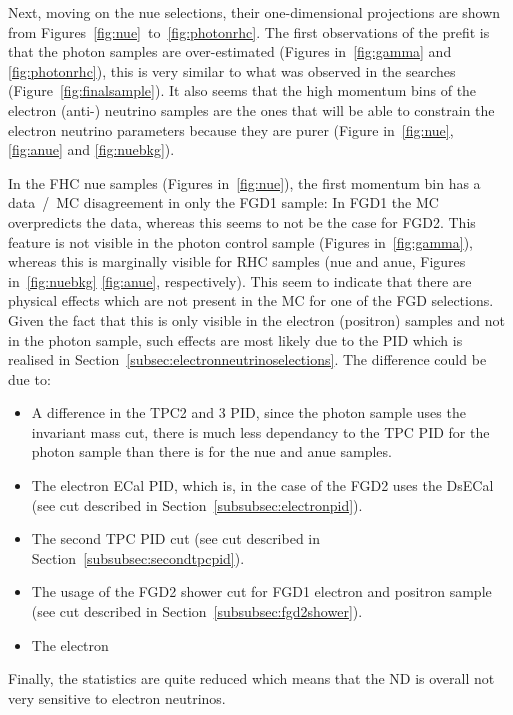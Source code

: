 Next, moving on the \Gls{nue} selections, their one-dimensional
projections are shown from
Figures~\ref{fig:nue}~to~\ref{fig:photonrhc}.  The first observations
of the prefit is that the photon samples are over-estimated (Figures
in~\ref{fig:gamma} and \ref{fig:photonrhc}), this is very similar to
what was observed in the \nisp searches
(Figure~\ref{fig:finalsample}). It also seems that the high momentum
bins of the electron (anti-) neutrino samples are the ones that will
be able to constrain the electron neutrino parameters because they are
purer (Figure in~\ref{fig:nue}, \ref{fig:anue} and \ref{fig:nuebkg}).

In the \Gls{FHC} \Gls{nue} samples (Figures in~\ref{fig:nue}), the
first momentum bin has a data~/~\Gls{MC} disagreement in only the
\Gls{FGD}1 sample: In \Gls{FGD}1 the \Gls{MC} overpredicts the data,
whereas this seems to not be the case for \Gls{FGD}2. This feature is
not visible in the photon control sample (Figures in~\ref{fig:gamma}),
whereas this is marginally visible for \Gls{RHC} samples (\Gls{nue}
and \Gls{anue}, Figures in~\ref{fig:nuebkg} \ref{fig:anue},
respectively). This seem to indicate that there are physical effects
which are not present in the \Gls{MC} for one of the \Gls{FGD}
selections. Given the fact that this is only visible in the electron
(positron) samples and not in the photon sample, such effects are most
likely due to the \Gls{PID} which is realised in
Section~\ref{subsec:electronneutrinoselections}. The difference could
be due to:
\begin{itemize}[noitemsep,topsep=0pt]
\item A difference in the \Gls{TPC}2 and 3 \Gls{PID}, since the photon
  sample uses the invariant mass cut, there is much less dependancy to
  the \Gls{TPC} \Gls{PID} for the photon sample than there is for the
  \Gls{nue} and \Gls{anue} samples.
\item The electron \Gls{ECal} \Gls{PID}, which is, in the case of the
  \Gls{FGD}2 uses the \Gls{DsECal} (see cut described in
  Section~\ref{subsubsec:electronpid}).
\item The second \Gls{TPC} \Gls{PID} cut (see cut described in
  Section~\ref{subsubsec:secondtpcpid}).
\item The usage of the \Gls{FGD}2 shower cut for \Gls{FGD}1 electron
  and positron sample (see cut described in
  Section~\ref{subsubsec:fgd2shower}).
\item The electron
\end{itemize}

Finally, the statistics are quite reduced which
means that the \Gls{ND} is overall not very sensitive to electron
neutrinos.



